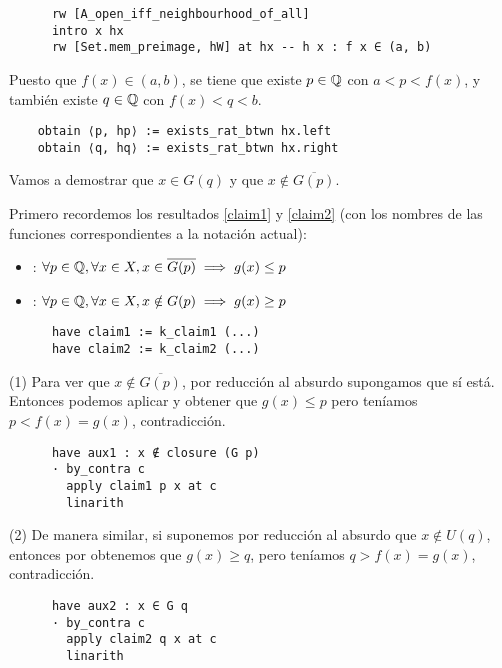 \begin{lstlisting}
      rw [A_open_iff_neighbourhood_of_all]
      intro x hx
      rw [Set.mem_preimage, hW] at hx -- h x : f x ∈ (a, b)
\end{lstlisting}

Puesto que $f(x) \in (a, b)$, se tiene que existe $p \in \mathbb{Q}$ con $a < p < f(x)$, y también existe $q \in \mathbb{Q}$ con $f(x) < q < b$.

\begin{lstlisting}
    obtain ⟨p, hp⟩ := exists_rat_btwn hx.left
    obtain ⟨q, hq⟩ := exists_rat_btwn hx.right
\end{lstlisting}

Vamos a demostrar que $x \in G(q)$ y que $x \notin \overline{G(p)}$.

Primero recordemos los resultados \ref{claim1} y \ref{claim2} (con los nombres de las funciones correspondientes a la notación actual):

\begin{itemize}
  \item {}: $\forall p \in \mathbb{Q},\forall x \in X, x \in \overline{G(p)} \implies g(x) \leq p$
  \item {}: $\forall p \in \mathbb{Q},\forall x \in X, x \notin G(p) \implies g(x) \geq p$
\end{itemize}

\begin{lstlisting}
      have claim1 := k_claim1 (...)
      have claim2 := k_claim2 (...)
\end{lstlisting}

(1) Para ver que $x \notin \overline{G(p)}$, por reducción al absurdo supongamos que sí está. Entonces podemos aplicar  y obtener que $g(x) \leq p$ pero teníamos $p < f(x) = g(x)$, contradicción.

\begin{lstlisting}
      have aux1 : x ∉ closure (G p)
      · by_contra c
        apply claim1 p x at c
        linarith
\end{lstlisting}

(2) De manera similar, si suponemos por reducción al absurdo que $x \notin U(q)$, entonces por  obtenemos que $g(x) \geq q$, pero teníamos $q > f(x) = g(x)$, contradicción.

\begin{lstlisting}
      have aux2 : x ∈ G q
      · by_contra c
        apply claim2 q x at c
        linarith
\end{lstlisting}

